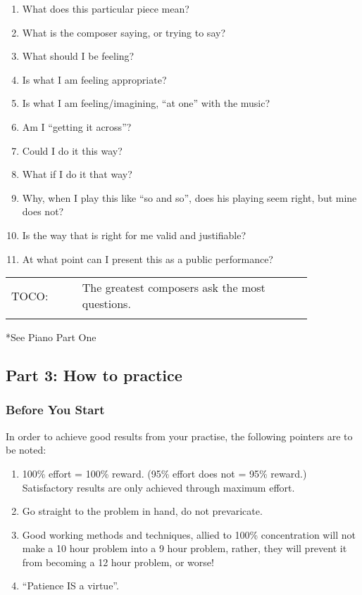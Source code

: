 \documentclass{article}
\begin{document}

\begin{enumerate}
    \item What does this particular piece mean?
    \item What is the composer saying, or trying to say?
    \item What should I be feeling?
    \item Is what I am feeling appropriate?
    \item Is what I am feeling/imagining, ``at one'' with the music?
    \item Am I ``getting it across''?
    \item Could I do it this way?
    \item What if I do it that way?
    \item Why, when I play this like ``so and so'', does his playing seem right, but mine does not?
    \item  Is the way that is right for me valid and justifiable?
    \item At what point can I present this as a public performance?
\end{enumerate}


\begin{tabular}{p{0.2\linewidth}p{0.65\linewidth}}
    \\
    TOCO: & The greatest composers ask the most questions.\\
    \\
\end{tabular}

*See Piano Part One

\subsection{Part 3: How to practice}

\subsubsection{Before You Start}

In order to achieve good results from your practise, the following pointers are to be noted:

\begin{enumerate}
    \item 100\% effort = 100\% reward.
        (95\% effort does not = 95\% reward.)
        Satisfactory  results are only achieved through maximum effort.
    \item Go straight to the problem in hand, do not prevaricate.
    \item Good  working methods and techniques, allied to 100\% concentration will not make a 10 hour problem into a 9 hour problem, rather, they will prevent it from becoming a 12 hour problem, or worse!
    \item ``Patience IS a virtue''.
\end{enumerate}
\end{document}
